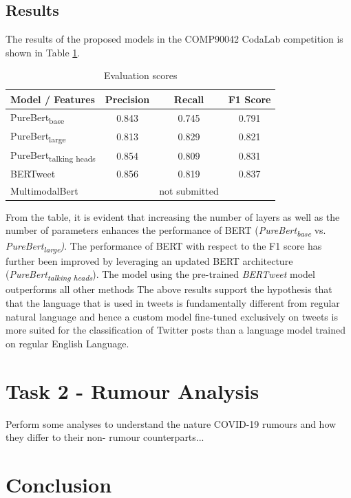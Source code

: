 \documentclass[11pt,a4paper]{article}
\begin{document}
\subsection{Results}
The results of the proposed models in the COMP90042 CodaLab competition is shown in Table \ref{tbl:evaluation_scores}.
\begin{table}
\centering
\small
\setlength\tabcolsep{2pt}
\begin{tabular}{lccc}
\hline 
\textbf{Model / Features} & Precision & Recall & F1 Score \\ \hline
PureBert\textsubscript{base} & 0.843 & 0.745 & 0.791 \\ %
PureBert\textsubscript{large} & 0.813 & 0.829 & 0.821 \\ %
PureBert\textsubscript{talking heads} & 0.854 & 0.809 & 0.831 \\ %
BERTweet & 0.856 & 0.819 & 0.837 \\ %
MultimodalBert  & & not submitted \\
\hline
\end{tabular}
\caption{Evaluation scores}
\label{tbl:evaluation_scores}
\end{table}
From the table, it is evident that increasing the number of layers as well as the number of parameters enhances the performance of BERT (\textit{PureBert\textsubscript{base}} vs. \textit{PureBert\textsubscript{large})}. The performance of BERT with respect to the F1 score has further been improved by leveraging an updated BERT architecture (\textit{PureBert\textsubscript{talking heads}}). The model using the pre-trained \textit{BERTweet} model outperforms all other methods 
\newline
The above results support the hypothesis that that the language that is used in tweets is fundamentally different from regular natural language and hence a custom model fine-tuned exclusively on tweets is more suited for the classification of Twitter posts than a language model trained on regular English Language.

\section{Task 2 - Rumour Analysis}

Perform some analyses to understand the nature COVID-19 rumours and how they differ to their non- rumour counterparts...

\section{Conclusion}

\newpage



\end{document}
